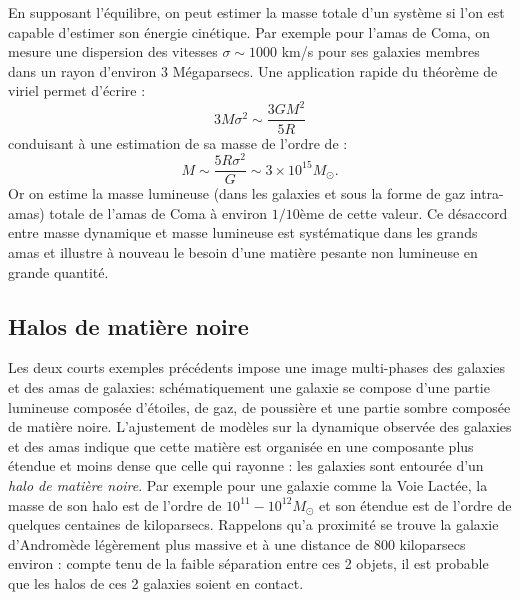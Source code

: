En supposant l'équilibre, on peut estimer la masse totale d'un système si l'on est capable d'estimer son énergie cinétique. Par exemple pour l'amas de Coma, on mesure une dispersion des vitesses $\sigma \sim 1000$ km/s pour ses galaxies membres dans un rayon d'environ 3 Mégaparsecs. Une application rapide du théorème de viriel permet d'écrire  :
\begin{equation}
3M\sigma^2\sim \frac{3GM^2}{5R}
\end{equation}
conduisant à une estimation de sa masse de l'ordre de :
\begin{equation}
M\sim\frac{5R\sigma^2}{G}\sim 3\times 10^{15} M_\odot.
\end{equation}
Or on estime la masse lumineuse (dans les galaxies et sous la forme de gaz intra-amas) totale de l'amas de Coma à environ $1/10$ème de cette valeur. Ce désaccord entre masse dynamique et masse lumineuse est systématique dans les grands amas et illustre à nouveau le besoin d'une matière pesante non lumineuse en grande quantité.

\subsection{Halos de matière noire}

Les deux courts exemples précédents impose une image multi-phases des galaxies et des amas de galaxies: schématiquement une galaxie se compose d'une partie lumineuse composée d'étoiles, de gaz, de poussière et une partie sombre composée de matière noire. L'ajustement de modèles sur la dynamique observée des galaxies et des amas indique que cette matière est organisée en une composante plus étendue et moins dense que celle qui rayonne : les galaxies sont entourée d'un \textit{halo de matière noire}. Par exemple pour une galaxie comme la Voie Lactée, la masse de son halo est de l'ordre de $10^{11}-10^{12} M_\odot$ et son étendue est de l'ordre de quelques centaines de kiloparsecs. Rappelons qu'a proximité se trouve la galaxie d'Andromède légèrement plus massive et à une distance de 800 kiloparsecs environ : compte tenu de la faible séparation entre ces 2 objets, il est probable que les halos de ces 2 galaxies soient en contact.

